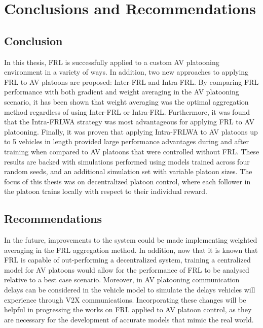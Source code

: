 \chapter{Conclusions and Recommendations} \label{chap:conclusion}
\section{Conclusion}
In this thesis, FRL is successfully applied to a custom AV platooning environment in a variety of ways.
In addition, two new approaches to applying
FRL to AV platoons are proposed: Inter-FRL and Intra-FRL.  By comparing FRL performance with both
gradient and weight averaging in the AV platooning scenario, it has been shown that
weight averaging was the optimal aggregation method regardless of using Inter-FRL or
Intra-FRL.  Furthermore, it was found that the Intra-FRLWA strategy was most advantageous
for applying FRL to AV platooning.  Finally, it was proven that applying Intra-FRLWA to
AV platoons up to 5 vehicles in length provided large performance advantages during and
after training when compared to AV platoons that were controlled without FRL. These
results are backed with simulations performed using models trained across four random
seeds, and an additional simulation set with variable platoon sizes.  The focus of this
thesis was on decentralized platoon control, where each follower in the platoon trains
locally with respect to their individual reward.

\section{Recommendations}
In the future, improvements to the system could be made implementing weighted averaging in
the FRL aggregation method. In addition, now that it is known that FRL is capable of out-performing
a decentralized system, training a centralized model for AV platoons
would allow for the performance of FRL to be analysed relative to a best case scenario.
Moreover, in AV platooning communication delays can be
considered in the vehicle model to simulate the delays vehicles will experience through V2X
communications. Incorporating these changes will be helpful in progressing the works on FRL applied to AV
platoon control, as they are necessary for the development of accurate models that mimic the real world.
